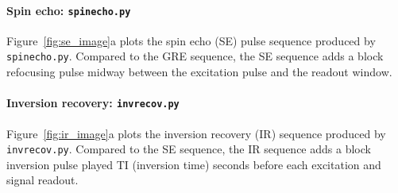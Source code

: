\documentclass[review]{elsarticle}
\begin{document}
\paragraph{Spin echo: \texttt{spinecho.py}}
Figure~\ref{fig:se_image}a plots the spin echo (SE) pulse sequence produced by \texttt{spinecho.py}. 
Compared to the GRE sequence, the SE sequence adds a block refocusing pulse midway between
the excitation pulse and the readout window. 

\paragraph{Inversion recovery: \texttt{invrecov.py}}
Figure~\ref{fig:ir_image}a plots the inversion recovery (IR) sequence produced by \texttt{invrecov.py}.
Compared to the SE sequence, 
the IR sequence adds a block inversion pulse played TI (inversion time) seconds before
each excitation and signal readout. 
\end{document}
